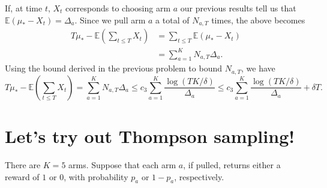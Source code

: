 \documentclass{article}
\newcommand{\E}[1]{\mathbb{E}\left(#1\right)}
\begin{document}
\begin{enumerate}
	If, at time $t$, $X_t$ corresponds to choosing arm $a$ our previous results tell us that $\E{\mu_*-X_t}=\Delta_a$. Since we pull arm $a$ a total of $N_{a,T}$ times, the above becomes
	\begin{align}
		T\mu_*-\E{\sum_{t\leq T}X_t} &= \sum_{t\leq T}\E{\mu_*-X_t}\\
		&= \sum_{a=1}^K N_{a,T}\Delta_a.
	\end{align}
	Using the bound derived in the previous problem to bound $N_{a,T}$, we have
	\begin{equation}
		T\mu_*-\E{\sum_{t\leq T}X_t} = \sum_{a=1}^K N_{a,T}\Delta_a \leq c_3\sum_{a=1}^K \frac{\log(TK/\delta)}{\Delta_a} \leq c_3\sum_{a=1}^K \frac{\log(TK/\delta)}{\Delta_a} + \delta T.
	\end{equation}

\end{enumerate}

\section{Let's try out Thompson sampling!}

There are $K=5$ arms. Suppose that each arm $a$, if pulled, returns either a reward of  $1$ or $0$, with probability $p_a$ or $1-p_a$, respectively.
\end{document}
